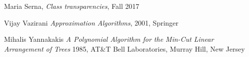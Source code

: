 \begin{thebibliography}{9}

  Maria Serna,
  \emph{Class transparencies},
  Fall 2017

  Vijay Vazirani
  \emph{Approximation Algorithms},
  2001, Springer

  Mihalis Yannakakis
  \emph{A Polynomial Algorithm for the Min-Cut Linear Arrangement of Trees}
  1985, AT\&T Bell Laboratories, Murray Hill, New Jersey 
\end{thebibliography}
